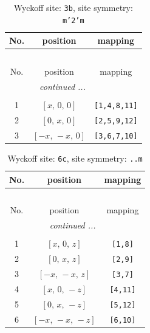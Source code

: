 \documentclass[fleqn,8pt]{jsarticle}
\begin{document}
\begin{longtable}{ccc}
\caption{Wyckoff site: {\tt 3b}, site symmetry: {\tt m'2'm}}
 \\
 \hline \hline
No. & position & mapping \\ \hline \endfirsthead

\multicolumn{2}{l}{\tablename\ \thetable{}} \\
 \hline \hline
No. & position & mapping \\ \hline \endhead

 \hline \hline
\multicolumn{2}{r}{\footnotesize\it continued ...} \\ \endfoot

 \hline \hline
\multicolumn{2}{r}{} \\ \endlastfoot

1 & $\left[ x,\, 0,\, 0 \right]$ & {\tt [1,4,8,11]} \\ \hline
2 & $\left[ 0,\, x,\, 0 \right]$ & {\tt [2,5,9,12]} \\ \hline
3 & $\left[ - x,\, - x,\, 0 \right]$ & {\tt [3,6,7,10]} \\
\end{longtable}
\renewcommand{\arraystretch}{1.2}
\begin{longtable}{ccc}
\caption{Wyckoff site: {\tt 6c}, site symmetry: {\tt ..m}}
 \\
 \hline \hline
No. & position & mapping \\ \hline \endfirsthead

\multicolumn{2}{l}{\tablename\ \thetable{}} \\
 \hline \hline
No. & position & mapping \\ \hline \endhead

 \hline \hline
\multicolumn{2}{r}{\footnotesize\it continued ...} \\ \endfoot

 \hline \hline
\multicolumn{2}{r}{} \\ \endlastfoot

1 & $\left[ x,\, 0,\, z \right]$ & {\tt [1,8]} \\ \hline
2 & $\left[ 0,\, x,\, z \right]$ & {\tt [2,9]} \\ \hline
3 & $\left[ - x,\, - x,\, z \right]$ & {\tt [3,7]} \\ \hline
4 & $\left[ x,\, 0,\, - z \right]$ & {\tt [4,11]} \\ \hline
5 & $\left[ 0,\, x,\, - z \right]$ & {\tt [5,12]} \\ \hline
6 & $\left[ - x,\, - x,\, - z \right]$ & {\tt [6,10]} \\
\end{longtable}
\end{document}
